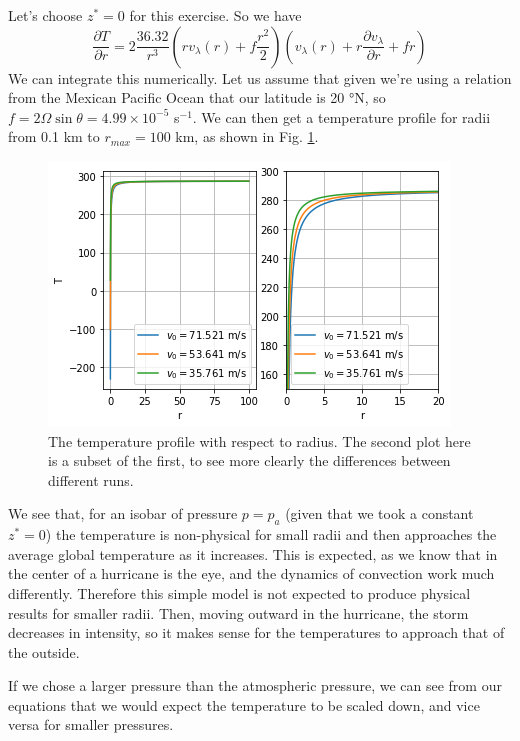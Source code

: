 Let's choose $z^*=0$ for this exercise. So we have 
\begin{equation*}
    \frac{\partial T}{\partial r} = 2\frac{36.32}{r^3}(rv_{\lambda}(r)+f\frac{r^2}{2})(v_{\lambda}(r)+r\frac{\partial v_{\lambda}}{\partial r}+fr)
\end{equation*}
We can integrate this numerically. Let us assume that given we're using a relation from the Mexican Pacific Ocean that our latitude is 20 °N, so $f=2\Omega \sin\theta=4.99\times10^{-5}$ s$^{-1}$. We can then get a temperature profile for radii from 0.1 km to $r_{max}=100$ km, as shown in Fig. \ref{fig:Tplot}.

\begin{figure}
    \centering
    \includegraphics[width=\linewidth]{assets/Tplot.png}
    \caption{The temperature profile with respect to radius. The second plot here is a subset of the first, to see more clearly the differences between different runs.}
    \label{fig:Tplot}
\end{figure}

We see that, for an isobar of pressure $p=p_a$ (given that we took a constant $z^*=0$) the temperature is non-physical for small radii and then approaches the average global temperature as it increases. This is expected, as we know that in the center of a hurricane is the eye, and the dynamics of convection work much differently. Therefore this simple model is not expected to produce physical results for smaller radii. Then, moving outward in the hurricane, the storm decreases in intensity, so it makes sense for the temperatures to approach that of the outside. 

If we chose a larger pressure than the atmospheric pressure, we can see from our equations that we would expect the temperature to be scaled down, and vice versa for smaller pressures. 
